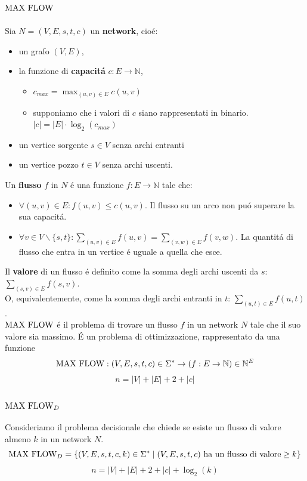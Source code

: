 \subsection{$\text{MAX FLOW}$}
Sia $N = (V, E, s, t, c)$ un \textbf{network}, cioé:
\begin{itemize}
	\item un grafo $(V, E)$, 
	\item la funzione di \textbf{capacitá} $c: E \rightarrow \mathbb{N}$,
	\begin{itemize}
        \item $c_{max} = \max_{(u, v) \in E} c(u, v)$
        \item supponiamo che i valori di $c$ siano rappresentati in binario. \\
        $|c| = |E| \cdot \log_2(c_{max})$
    \end{itemize}
	\item un vertice sorgente $s \in V$ senza archi entranti 
	\item un vertice pozzo $t \in V$ senza archi uscenti.
\end{itemize} 
Un \textbf{flusso} $f$ in $N$ é una funzione $f: E \rightarrow \mathbb{N}$ tale che:
\begin{itemize}
    \item $\forall (u, v) \in E : f(u, v) \leq c(u, v)$. 
        \subitem Il flusso su un arco non puó superare la sua capacitá.
    \item $\forall v \in V \smallsetminus \{s, t\} : \sum_{(u, v) \in E} f(u, v) = \sum_{(v, w) \in E} f(v, w)$. 
        \subitem La quantitá di flusso che entra in un vertice é uguale a quella che esce.
\end{itemize}
Il \textbf{valore} di un flusso é definito come la somma degli archi uscenti da $s$: $\sum_{(s, v) \in E} f(s, v)$. \\
O, equivalentemente, come la somma degli archi entranti in $t$: $\sum_{(u, t) \in E} f(u, t)$. \\

$\text{MAX FLOW}$ é il problema di trovare un flusso $f$ in un network $N$ tale che il suo valore sia massimo.
É un problema di ottimizzazione, rappresentato da una funzione 
\[
\text{MAX FLOW}: (V, E, s, t, c) \in \Sigma^* \rightarrow (f: E \rightarrow \mathbb{N}) \in \mathbb{N}^E
\]
\[
n = |V| + |E| + 2 + |c|
\]

\subsubsection{$\text{MAX FLOW}_D$}
Consideriamo il problema decisionale che chiede se esiste un flusso di valore almeno $k$ in un network $N$.
\[
\text{MAX FLOW}_D = \{ (V, E, s, t, c, k) \in \Sigma^* \mid (V, E, s, t, c) \text{ ha un flusso di valore} \geq k \}
\]
\[
n = |V| + |E| + 2 + |c| + \log_2(k)
\]

